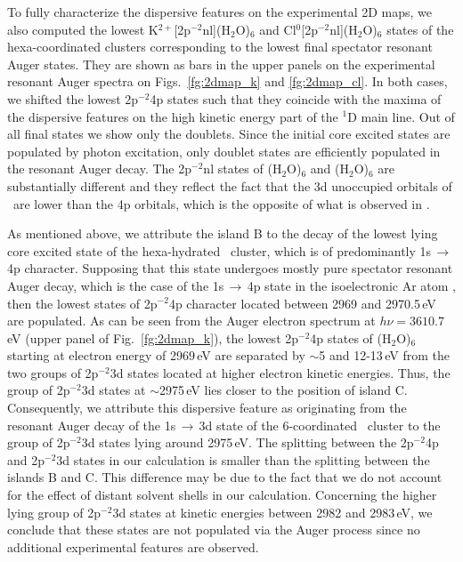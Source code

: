 To fully characterize the dispersive features on the experimental 2D maps, we also computed the lowest K$^{2+}$[2p$^{-2}$nl](H$_2$O)$_6$ and Cl$^{0}$[2p$^{-2}$nl](H$_2$O)$_6$ states of the hexa-coordinated clusters corresponding to the lowest final spectator resonant Auger states. They are shown as bars in the upper panels on the experimental resonant Auger spectra on Figs.\ \ref{fg:2dmap_k} and \ref{fg:2dmap_cl}. In both cases, we shifted the lowest 2p$^{-2}$4p states such that they coincide with the maxima of the dispersive features on the high kinetic energy part of the $^1$D main line. Out of all final states we show only the doublets. Since the initial core excited states are populated by photon excitation, only doublet states are efficiently populated in the resonant Auger decay. The 2p$^{-2}$nl states of \ki(H$_2$O)$_6$ and \cli(H$_2$O)$_6$ are substantially different and they reflect the fact that the 3d unoccupied orbitals of \ki~are lower than the 4p orbitals, which is the opposite of what is observed in \cli. 


As mentioned above, we attribute the island B to the decay of the lowest lying core excited state of the hexa-hydrated \ki~cluster, which is of predominantly 1s$\,\rightarrow\,$4p character. Supposing that this state undergoes mostly pure spectator resonant Auger decay, which is the case of the 1s$\,\rightarrow\,$4p state in the isoelectronic Ar atom \citep{ceolin15:022502}, then the lowest states of 2p$^{-2}$4p character located between 2969 and 2970.5\,eV are populated. As can be seen from the Auger electron spectrum at $h\nu = 3610.7$\,eV (upper panel of Fig.\ \ref{fg:2dmap_k}), the lowest 2p$^{-2}$4p states of \ki(H$_2$O)$_6$ starting at electron energy of 2969\,eV are separated by $\sim$5 and 12-13\,eV from the two groups of 2p$^{-2}$3d states located at higher electron kinetic energies. Thus, the group of 2p$^{-2}$3d states at $\sim$2975\,eV lies closer to the position of island C. Consequently, we attribute this dispersive feature as originating from the resonant Auger decay of the 1s$\,\rightarrow\,$3d state of the 6-coordinated \ki~cluster to the group of 2p$^{-2}$3d states lying around 2975\,eV. The splitting between the 2p$^{-2}$4p and 2p$^{-2}$3d states in our calculation is smaller than the splitting between the islands B and C. This difference may be due to the fact that we do not account for the effect of distant solvent shells in our calculation. Concerning the higher lying group of 2p$^{-2}$3d states at kinetic energies between 2982 and 2983\,eV, we conclude that these states are not populated via the Auger process since no additional experimental features are observed.

